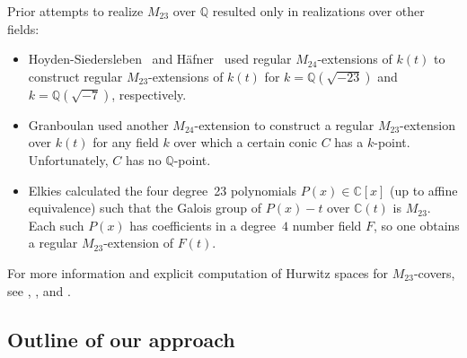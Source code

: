 \documentclass[12pt,reqno]{amsart}
\newcommand{\C}{\mathbb{C}}
\newcommand{\Q}{\mathbb{Q}}
\theoremstyle{definition}
\theoremstyle{remark}
\begin{document}
Prior attempts to realize $M_{23}$ over $\Q$ resulted only in realizations over other fields:
\begin{itemize}
\item Hoyden-Siedersleben~\cite{Hoyden-Siedersleben1985} and H\"afner~\cite{Haefner1987} used regular $M_{24}$-extensions of $k(t)$ to construct regular $M_{23}$-extensions of $k(t)$ for $k=\Q(\sqrt{-23})$ and $k=\Q(\sqrt{-7})$, respectively.
\item Granboulan \cite{Granboulan1996} used another $M_{24}$-extension to construct a regular $M_{23}$-extension over $k(t)$ for any field $k$ over which a certain conic $C$ has a $k$-point.
Unfortunately, $C$ has no $\Q$-point.
\item Elkies \cite{Elkies2013} calculated the four degree~23 polynomials $P(x) \in \C[x]$ (up to affine equivalence) such that the Galois group of $P(x)-t$ over $\C(t)$ is $M_{23}$.
Each such $P(x)$ has coefficients in a degree~$4$ number field $F$, 
so one obtains a regular $M_{23}$-extension of $F(t)$.
\end{itemize}
For more information and explicit computation of Hurwitz spaces for $M_{23}$-covers, see \cite{Koenig2014}, \cite{Haefner-preprint}, and \cite{Seguin25}.

\subsection{Outline of our approach}
\end{document}
